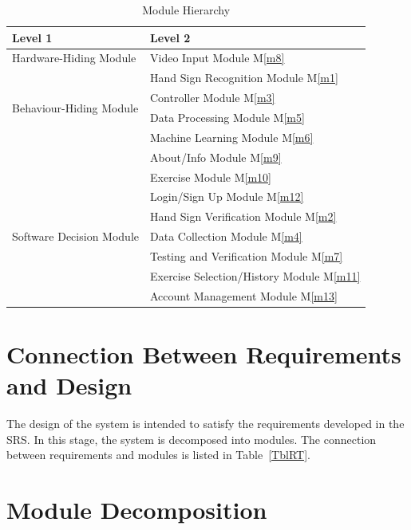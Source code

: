\documentclass[12pt, titlepage]{article}
\newcommand{\mref}[1]{M\ref{#1}}
\begin{document}
\begin{table}[h!]
\centering
\begin{tabular}{p{} p{}}
\toprule
\textbf{Level 1} & \textbf{Level 2}\\
\midrule

\multirow{1}{0.3\textwidth}{Hardware-Hiding Module} 
& Video Input Module \mref{m8}\\
\midrule

\multirow{4}{0.3\textwidth}{Behaviour-Hiding Module} 
& Hand Sign Recognition Module \mref{m1}\\
& Controller Module \mref{m3}\\
& Data Processing Module \mref{m5}\\
& Machine Learning Module \mref{m6}\\
& About/Info Module \mref{m9}\\
& Exercise Module \mref{m10}\\
& Login/Sign Up Module \mref{m12}\\
\midrule

\multirow{3}{0.3\textwidth}{Software Decision Module} 
& Hand Sign Verification Module \mref{m2}\\
& Data Collection Module \mref{m4}\\
& Testing and Verification Module \mref{m7}\\
& Exercise Selection/History Module \mref{m11}\\
& Account Management Module \mref{m13}\\
\bottomrule

\end{tabular}
\caption{Module Hierarchy}
\label{TblMH}
\end{table}

\section{Connection Between Requirements and Design} \label{SecConnection}

The design of the system is intended to satisfy the requirements developed in
the SRS. In this stage, the system is decomposed into modules. The connection
between requirements and modules is listed in Table~\ref{TblRT}.

\section{Module Decomposition} \label{SecMD}
\end{document}
